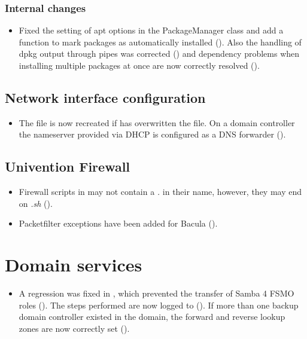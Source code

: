 \subsubsection{Internal changes}
\begin{itemize}
\item Fixed the setting of apt options in the PackageManager class and add a function to mark
  packages as automatically installed (). Also the
  handling of dpkg output through pipes was corrected
  () and dependency problems when installing multiple
  packages at once are now correctly resolved ().
\end{itemize}


\subsection{Network interface configuration}
\begin{itemize}
\item The file  is now recreated if  has overwritten
the file. On a domain controller the nameserver provided via DHCP is configured as a DNS
forwarder ().
\end{itemize}


\subsection{Univention Firewall}
\begin{itemize}
\item Firewall scripts in  may
  not contain a \emph{.} in their name, however, they may end on
  \emph{.sh} ().
\item Packetfilter exceptions have been added for Bacula ().
\end{itemize}


\section{Domain services}
\begin{itemize}
\item A regression was fixed in ,
  which prevented the transfer of Samba 4 FSMO roles
  (). The steps performed are now logged to
   (). If
  more than one backup domain controller existed in the domain, the forward and
  reverse lookup zones are now correctly set ().
\end{itemize}

